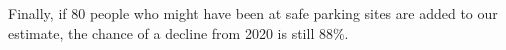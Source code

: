 \documentclass[11pt]{article}
\def\bfr{\bf\color{red}}
\begin{document}
%
%
%



Finally, if 80 people who might have been at safe parking sites are added to our estimate, 
the chance of a decline from 2020 is still 88\%.\\%
\end{document}
